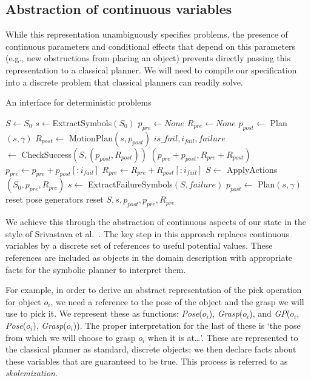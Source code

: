 \subsection{Abstraction of continuous variables}
While this representation unambiguously specifies problems, the
presence of continuous parameters and conditional effects that depend
on this parameters (e.g., new obstructions from placing an object)
prevents directly passing this representation to a classical
planner. We will need to compile our specification into a discrete
problem that classical planners can readily solve.

\begin{algorithm}
 \caption{An interface for deterministic problems} \label{alg-ifop}
 \begin{algorithmic}[1]
  \State $S \leftarrow S_0$
  \State $s \leftarrow $ExtractSymbols$(S_0)$
  \State $p_{pre} \leftarrow None$
  \State $R_{pre} \leftarrow None$
  \State $p_{post} \leftarrow $ Plan$(s, \gamma)$
     \State $R_{post} \leftarrow $ MotionPlan$(s, p_{post})$
     \State $is\_fail, i_{fail}, failure$\\\hspace{50pt}$ \leftarrow $ CheckSuccess$(S, (p_{post}, R_{post}))$
         \State \Return $(p_{pre} + p_{post}, R_{pre} + R_{post})$
     \EndIf
     \State $p_{pre} \leftarrow p_{pre} + p_{post}[:i_{fail}]$
     \State $R_{pre} \leftarrow R_{pre} + R_{post}[:i_{fail}]$
     \State $S \leftarrow $ ApplyActions$(S_0, p_{pre}, R_{pre})$
     \State $s\leftarrow $ ExtractFailureSymbols$(S, failure)$
     \State $p_{post} \leftarrow $ Plan$(s, \gamma)$     
        \State reset pose generators
        \State reset $S, s, p_{post}, p_{pre}, R_{pre}$
     \EndIf
  \EndWhile
  \EndProcedure
 \end{algorithmic}
\end{algorithm}

We achieve this through the abstraction of continuous aspects of our
state in the style of Srivastava et
al.~\cite{srivastava2014combined}. The key step in this approach
replaces continuous variables by a discrete set of references to useful
potential values. These references are included as objects in
the domain description with appropriate facts for the symbolic planner
to interpret them.

For example, in order to derive an abstract representation of the pick
operation for object $o_i$, we need a reference to the pose of the
object and the grasp we will use to pick it. We represent these as
functions: \emph{Pose}($o_i$), \emph{Grasp}($o_i$), and
\emph{GP}($o_i$, \emph{Pose}($o_i$), \emph{Grasp}($o_i$)). The proper
interpretation for the last of these is `the pose from which we will choose
to grasp $o_i$ when it is at\ldots'. These are represented to the
classical planner as standard, discrete objects; we then declare facts
about these variables that are guaranteed to be true. This process is
referred to as \emph{skolemization}.

